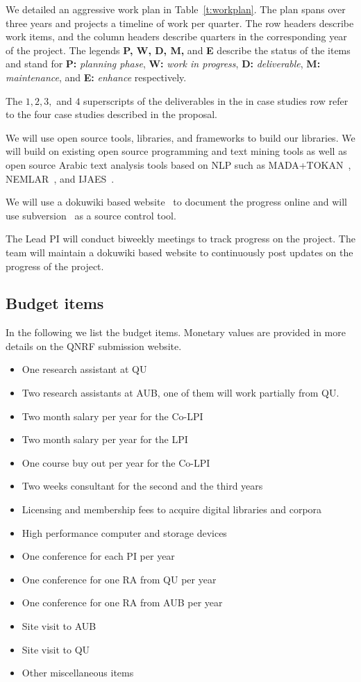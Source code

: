 \documentclass[12pt]{article}
\begin{document}
We detailed an aggressive work plan in Table~\ref{t:workplan}. 
The plan spans over three years and projects a timeline
of work per quarter. 
The row headers describe work items, and the column headers
describe quarters in the corresponding year of the project.
The legends {\bf P, W, D, M, } 
and {\bf E} 
describe the status of the items 
and stand for 
{\bf P:} {\em planning phase}, 
{\bf W:} {\em work in progress}, 
{\bf D:} {\em deliverable}, 
{\bf M:}  {\em maintenance}, 
and 
{\bf E: } {\em enhance} respectively. 

The $1,2,3,$ and $4$
superscripts of the deliverables in the 
in case studies row refer to the four 
case studies described in the proposal. 

We will use open source tools, libraries, and frameworks to 
build our libraries.
We will build on existing open source programming and text 
mining tools as well as open source Arabic text analysis tools 
based on NLP such as MADA+TOKAN~\cite{Rot08}, 
NEMLAR~\cite{RAl09}, and IJAES~\cite{Int09}.

We will use a dokuwiki based website~\cite{Dok09} 
to document the progress online and will use 
subversion~\cite{Sub09} as a source control tool.
 
The Lead PI will conduct biweekly meetings to track progress 
on the project.
The team will maintain a dokuwiki based website to continuously 
post updates on the progress of the project.


\subsection{Budget items}

In the following we list the budget items. 
Monetary values are provided in more details on the QNRF 
submission website. 

\begin{itemize}
\item One research assistant at QU
\item Two research assistants at AUB, one of them will 
work partially from QU. 
\item Two month salary per year for the Co-LPI
\item Two month salary per year for the LPI
\item One course buy out per year for the Co-LPI
\item Two weeks consultant for the second and the third years
\item Licensing and membership fees to acquire digital libraries and corpora
\item High performance computer and storage devices
\item One conference for each PI per year
\item One conference for one RA from QU per year
\item One conference for one RA from AUB per year
\item Site visit to AUB 
\item Site visit to QU 
\item Other miscellaneous items
\end{itemize}
\end{document}
